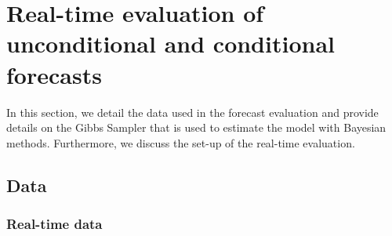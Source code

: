 \documentclass[notitlepage,a4paper,12pt]{article}
\begin{document}

\section{Real-time evaluation of unconditional and conditional forecasts}

In this section, we detail the data used in the forecast evaluation and provide details on the Gibbs Sampler that is used to estimate the model with Bayesian methods. Furthermore, we discuss the set-up of the real-time evaluation. 

\subsection{Data}
\subsubsection{Real-time data}
\end{document}
